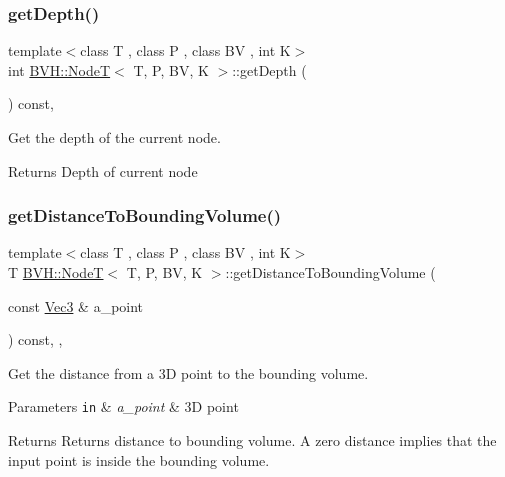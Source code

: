 \subsubsection{\texorpdfstring{get\+Depth()}{getDepth()}}
{\footnotesize\ttfamily template$<$class T , class P , class BV , int K$>$ \\
int \hyperlink{classBVH_1_1NodeT}{B\+V\+H\+::\+NodeT}$<$ T, P, BV, K $>$\+::get\+Depth (\begin{DoxyParamCaption}{ }\end{DoxyParamCaption}) const\hspace{0.3cm}{\ttfamily [inline]}, {\ttfamily [noexcept]}}



Get the depth of the current node. 

\begin{DoxyReturn}{Returns}
Depth of current node 
\end{DoxyReturn}
\mbox{\label{classBVH_1_1NodeT_a8da9f78078b0a579868d026bd61a2947}} 
\subsubsection{\texorpdfstring{get\+Distance\+To\+Bounding\+Volume()}{getDistanceToBoundingVolume()}}
{\footnotesize\ttfamily template$<$class T , class P , class BV , int K$>$ \\
T \hyperlink{classBVH_1_1NodeT}{B\+V\+H\+::\+NodeT}$<$ T, P, BV, K $>$\+::get\+Distance\+To\+Bounding\+Volume (\begin{DoxyParamCaption}\item[{const \hyperlink{classBVH_1_1NodeT_a6fbb4308c5c55ee170c5f992df7ae1d0}{Vec3} \&}]{a\+\_\+point }\end{DoxyParamCaption}) const\hspace{0.3cm}{\ttfamily [inline]}, {\ttfamily [protected]}, {\ttfamily [noexcept]}}



Get the distance from a 3D point to the bounding volume. 


\begin{DoxyParams}[1]{Parameters}
\mbox{\tt in}  & {\em a\+\_\+point} & 3D point \\
\hline
\end{DoxyParams}
\begin{DoxyReturn}{Returns}
Returns distance to bounding volume. A zero distance implies that the input point is inside the bounding volume. 
\end{DoxyReturn}
\mbox{\label{classBVH_1_1NodeT_a06708a2711fd354a3c382da664cfe154}} 
